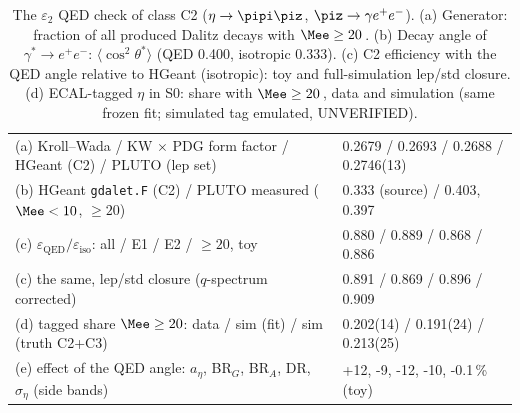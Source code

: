 \begin{table}[H]
\centering
\caption{The $\varepsilon_2$ QED check of class C2 ($\eta\to\pipi\piz$, $\piz\to\gamma e^+e^-$). (a) Generator: fraction of all produced Dalitz decays with $\Mee\geq20$\,\MeVcc. (b) Decay angle of $\gamma^*\to e^+e^-$: $\langle\cos^2\theta^*\rangle$ (QED 0.400, isotropic 0.333). (c) C2 efficiency with the QED angle relative to HGeant (isotropic): toy and full-simulation lep/std closure. (d) ECAL-tagged $\eta$ in S0: share with $\Mee\geq20$\,\MeVcc, data and simulation (same frozen fit; simulated tag emulated, UNVERIFIED).}
\label{tab:eps2}
\footnotesize
\begin{tabular}{@{}l l@{}}
\toprule
(a) Kroll--Wada / KW $\times$ PDG form factor / HGeant (C2) / PLUTO (lep set) & 0.2679 / 0.2693 / 0.2688 / 0.2746(13) \\
(b) HGeant \texttt{gdalet.F} (C2) / PLUTO measured ($\Mee<10$, $\geq20$) & 0.333 (source) / 0.403, 0.397 \\
(c) $\varepsilon_{\mathrm{QED}}/\varepsilon_{\mathrm{iso}}$: all / E1 / E2 / $\geq20$, toy & 0.880 / 0.889 / 0.868 / 0.886 \\
(c) the same, lep/std closure ($q$-spectrum corrected) & 0.891 / 0.869 / 0.896 / 0.909 \\
(d) tagged share $\Mee\geq20$: data / sim (fit) / sim (truth C2+C3) & 0.202(14) / 0.191(24) / 0.213(25) \\
(e) effect of the QED angle: $a_\eta$, BR$_G$, BR$_A$, DR, $\sigma_\eta$ (side bands) & +12, -9, -12, -10, -0.1\,\% (toy) \\
\bottomrule
\end{tabular}
\end{table}

